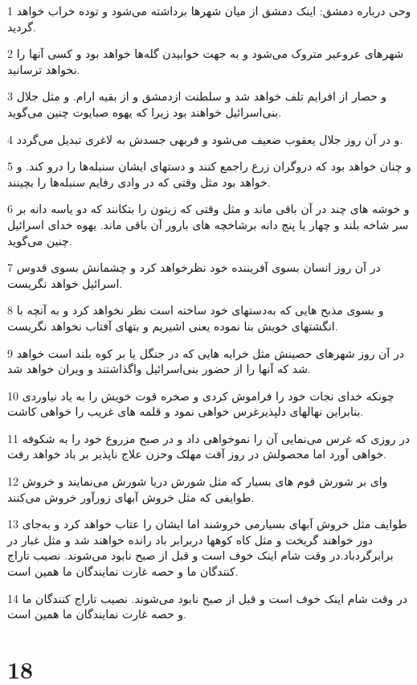 \par 1 وحی درباره دمشق: اینک دمشق از میان شهرها برداشته می‌شود و توده خراب خواهد گردید.
\par 2 شهرهای عروعیر متروک می‌شود و به جهت خوابیدن گله‌ها خواهد بود و کسی آنها را نخواهد ترسانید.
\par 3 و حصار از افرایم تلف خواهد شد و سلطنت ازدمشق و از بقیه ارام. و مثل جلال بنی‌اسرائیل خواهند بود زیرا که یهوه صبایوت چنین می‌گوید.
\par 4 و در آن روز جلال یعقوب ضعیف می‌شود و فربهی جسدش به لاغری تبدیل می‌گردد.
\par 5 و چنان خواهد بود که دروگران زرع راجمع کنند و دستهای ایشان سنبله‌ها را درو کند. و خواهد بود مثل وقتی که در وادی رفایم سنبله‌ها را بچینند.
\par 6 و خوشه های چند در آن باقی ماند و مثل وقتی که زیتون را بتکانند که دو یاسه دانه بر سر شاخه بلند و چهار یا پنج دانه برشاخچه های بارور آن باقی ماند. یهوه خدای اسرائیل چنین می‌گوید.
\par 7 در آن روز انسان بسوی آفریننده خود نظرخواهد کرد و چشمانش بسوی قدوس اسرائیل خواهد نگریست.
\par 8 و بسوی مذبح هایی که به‌دستهای خود ساخته است نظر نخواهد کرد و به آنچه با انگشتهای خویش بنا نموده یعنی اشیریم و بتهای آفتاب نخواهد نگریست.
\par 9 در آن روز شهرهای حصینش مثل خرابه هایی که در جنگل یا بر کوه بلند است خواهد شد که آنها را از حضور بنی‌اسرائیل واگذاشتند و ویران خواهد شد.
\par 10 چونکه خدای نجات خود را فراموش کردی و صخره قوت خویش را به یاد نیاوردی بنابراین نهالهای دلپذیرغرس خواهی نمود و قلمه های غریب را خواهی کاشت.
\par 11 در روزی که غرس می‌نمایی آن را نموخواهی داد و در صبح مزروع خود را به شکوفه خواهی آورد اما محصولش در روز آفت مهلک وحزن علاج ناپذیر بر باد خواهد رفت.
\par 12 وای بر شورش قوم های بسیار که مثل شورش دریا شورش می‌نمایند و خروش طوایفی که مثل خروش آبهای زورآور خروش می‌کنند.
\par 13 طوایف مثل خروش آبهای بسیارمی خروشند اما ایشان را عتاب خواهد کرد و به‌جای دور خواهند گریخت و مثل کاه کوهها دربرابر باد رانده خواهند شد و مثل غبار در برابرگردباد.در وقت شام اینک خوف است و قبل از صبح نابود می‌شوند. نصیب تاراج کنندگان ما و حصه غارت نمایندگان ما همین است.
\par 14 در وقت شام اینک خوف است و قبل از صبح نابود می‌شوند. نصیب تاراج کنندگان ما و حصه غارت نمایندگان ما همین است.
 
\chapter{18}

